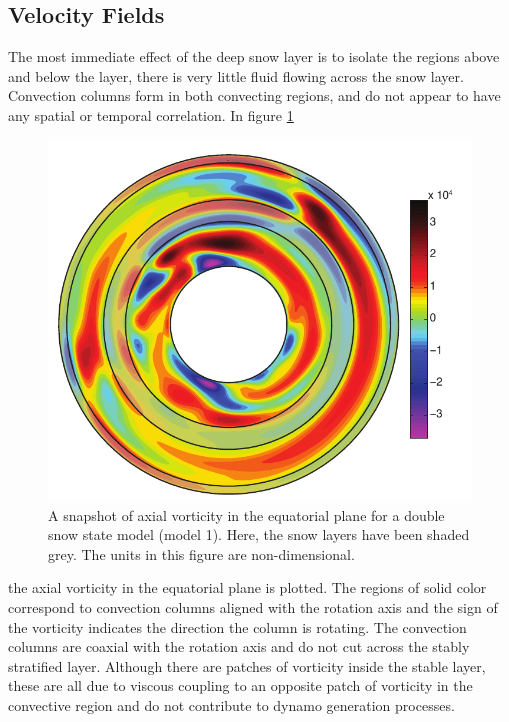 \subsection{Velocity Fields}
The most immediate effect of the deep snow layer is to isolate the regions above and below the layer, there is very little fluid flowing across the snow layer. Convection columns form in both convecting regions, and do not appear to have any spatial or temporal correlation. In figure \ref{fig:vorticity}
\begin{figure}
	\centering
	\noindent\includegraphics[width=.6\linewidth]{Chapter4/figures/wz19_043_2500_00.pdf}
	\caption{A snapshot of axial vorticity in the equatorial plane for a double snow state model (model 1). Here, the snow layers have been shaded grey. The units in this figure are non-dimensional.}
	\label{fig:vorticity}
\end{figure}
the axial vorticity in the equatorial plane is plotted. The regions of solid color correspond to convection columns aligned with the rotation axis and the sign of the vorticity indicates the direction the column is rotating. The convection columns are coaxial with the rotation axis and do not cut across the stably stratified layer. Although there are patches of vorticity inside the stable layer, these are all due to viscous coupling to an opposite patch of vorticity in the convective region and do not contribute to dynamo generation processes.

